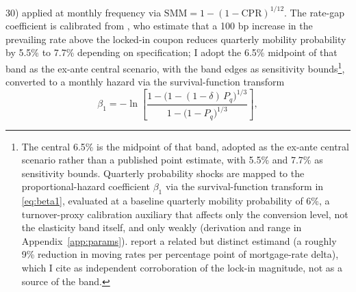 \documentclass[12pt]{article}
\begin{document}
30) applied at monthly frequency via $\mathrm{SMM} = 1-(1-\mathrm{CPR})^{1/12}$. The rate-gap coefficient is calibrated from \citet{liebersohn2024}, who estimate that a 100 bp increase in the prevailing rate above the locked-in coupon reduces quarterly mobility probability by 5.5\% to 7.7\% depending on specification; I adopt the 6.5\% midpoint of that band as the ex-ante central scenario, with the band edges as sensitivity bounds\footnote{The central 6.5\% is the midpoint of that band, adopted as the ex-ante central scenario rather than a published point estimate, with 5.5\% and 7.7\% as sensitivity bounds. Quarterly probability shocks are mapped to the proportional-hazard coefficient $\beta_1$ via the survival-function transform in \eqref{eq:beta1}, evaluated at a baseline quarterly mobility probability of 6\%, a turnover-proxy calibration auxiliary that affects only the conversion level, not the elasticity band itself, and only weakly (derivation and range in Appendix~\ref{app:params}). \citet{fonseca2024} report a related but distinct estimand (a roughly 9\% reduction in moving rates per percentage point of mortgage-rate delta), which I cite as independent corroboration of the lock-in magnitude, not as a source of the band.}, converted to a monthly hazard via the survival-function transform
\begin{equation}\label{eq:beta1}
\beta_1 = -\ln\!\left[\frac{1-\big(1-(1-\delta)\,P_q\big)^{1/3}}{1-\big(1-P_q\big)^{1/3}}\right],
\end{equation}
\end{document}
